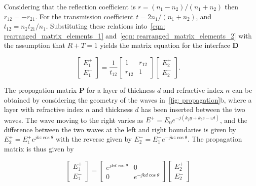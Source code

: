 Considering that the reflection coefficient is $r = \left( n_1 - n_2 \right) / \left( n_1 + n_2 \right)$ then $r_{12} = - r_{21}$. For the transmission coefficient $t = 2 n_1 / \left( n_1 + n_2 \right)$, and $t_{12} = n_2 t_{21} / n_1$. Substituting these relations into~\ref{eqn: rearranged_matrix_elements_1} and~\ref{eqn: rearranged_matrix_elements_2} with the assumption that $R + T = 1$ yields the matrix equation for the interface $\mathbf{D}$ 

\begin{equation} \label{eqn: interface_matrix}
	\begin{bmatrix} E_1^+ \\ E_1^- \end{bmatrix} = \frac{1}{t_{12}} \begin{bmatrix} 1 & r_{12} \\ r_{12} & 1 \end{bmatrix} \begin{bmatrix} E_2^+ \\ E_2^- \end{bmatrix}.
\end{equation}

The propagation matrix $\mathbf{P}$ for a layer of thickness $d$ and refractive index $n$ can be obtained by considering the geometry of the waves in~\ref{fig: propagation}b, where a layer with refractive index $n$ and thickness $d$ has been inserted between the two waves. The wave moving to the right varies as $E^+ = E_0 e^{-j\left( k_y y + k_z z - \omega t \right)}$, and the difference between the two waves at the left and right boundaries is given by $E_2^+ = E_1^+ e^{j k z\cos \theta}$ with the reverse given by $E_2^- = E_1^- e^{-j k z \cos \theta}$. The propagation matrix is thus given by

\begin{equation} \label{eqn: propagation_matrix}
	\begin{bmatrix} E_1^+ \\ E_1^- \end{bmatrix} = \begin{bmatrix} e^{j k d \cos \theta} & 0 \\ 0 & e^{-j k d \cos \theta } \end{bmatrix} \begin{bmatrix} E_2^+ \\ E_2^- \end{bmatrix}
\end{equation}

